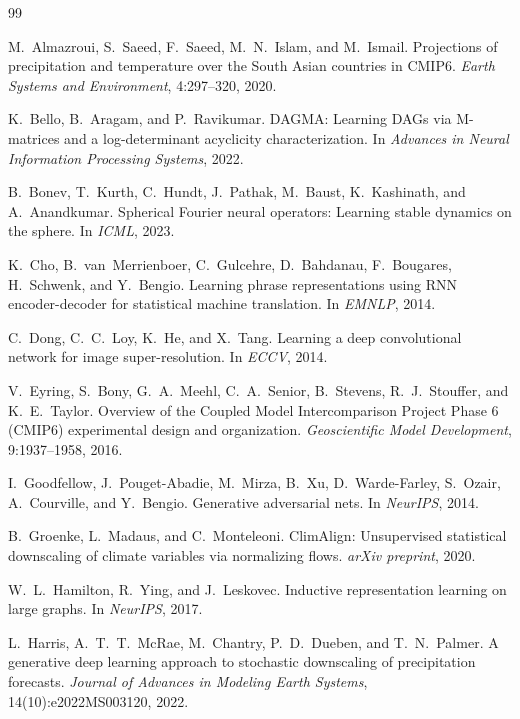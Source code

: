 \documentclass[14pt,a4paper,openany]{extreport}
\theoremstyle{definition}
\begin{document}
\begin{thebibliography}{99}

 M.~Almazroui, S.~Saeed, F.~Saeed, M.~N.~Islam, and M.~Ismail. Projections of precipitation and temperature over the South Asian countries in CMIP6. \emph{Earth Systems and Environment}, 4:297--320, 2020.

 K.~Bello, B.~Aragam, and P.~Ravikumar. DAGMA: Learning DAGs via M-matrices and a log-determinant acyclicity characterization. In \emph{Advances in Neural Information Processing Systems}, 2022.

 B.~Bonev, T.~Kurth, C.~Hundt, J.~Pathak, M.~Baust, K.~Kashinath, and A.~Anandkumar. Spherical Fourier neural operators: Learning stable dynamics on the sphere. In \emph{ICML}, 2023.

 K.~Cho, B.~van~Merrienboer, C.~Gulcehre, D.~Bahdanau, F.~Bougares, H.~Schwenk, and Y.~Bengio. Learning phrase representations using RNN encoder-decoder for statistical machine translation. In \emph{EMNLP}, 2014.

 C.~Dong, C.~C.~Loy, K.~He, and X.~Tang. Learning a deep convolutional network for image super-resolution. In \emph{ECCV}, 2014.

 V.~Eyring, S.~Bony, G.~A.~Meehl, C.~A.~Senior, B.~Stevens, R.~J.~Stouffer, and K.~E.~Taylor. Overview of the Coupled Model Intercomparison Project Phase 6 (CMIP6) experimental design and organization. \emph{Geoscientific Model Development}, 9:1937--1958, 2016.

 I.~Goodfellow, J.~Pouget-Abadie, M.~Mirza, B.~Xu, D.~Warde-Farley, S.~Ozair, A.~Courville, and Y.~Bengio. Generative adversarial nets. In \emph{NeurIPS}, 2014.

 B.~Groenke, L.~Madaus, and C.~Monteleoni. ClimAlign: Unsupervised statistical downscaling of climate variables via normalizing flows. \emph{arXiv preprint}, 2020.

 W.~L.~Hamilton, R.~Ying, and J.~Leskovec. Inductive representation learning on large graphs. In \emph{NeurIPS}, 2017.

 L.~Harris, A.~T.~T.~McRae, M.~Chantry, P.~D.~Dueben, and T.~N.~Palmer. A generative deep learning approach to stochastic downscaling of precipitation forecasts. \emph{Journal of Advances in Modeling Earth Systems}, 14(10):e2022MS003120, 2022.


\end{thebibliography}
\end{document}

